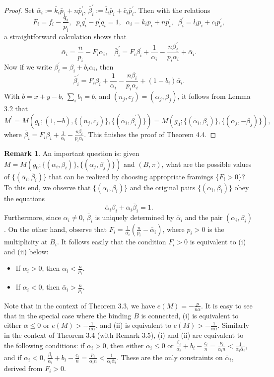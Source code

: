 \documentclass[11pt]{amsart}
\theoremstyle{plain}
\numberwithin{theorem}{section}
\theoremstyle{definition}
\newtheorem{remark}[theorem]{Remark}
\begin{document}
\begin{proof}
Set $\bar{\alpha}_i:=\bar{k}_i\bar{p}_i+n\bar{p}_i^\prime$, 
$\bar{\beta}_i^\prime:=\bar{l}_i\bar{p}_i+\bar{c}_i\bar{p}_i^\prime$. Then with the relations
$$
F_i=f_i-\frac{q_i}{p_i},\;\; p_iq_i^\prime-p_i^\prime q_i=1, \;\; \alpha_i=k_ip_i+np_i^\prime, \;\;\beta_i^\prime=l_ip_i+c_ip_i^\prime, 
$$
a straightforward calculation shows that
$$
\bar{\alpha}_i=\frac{n}{p_i}-F_i\alpha_i, \;\;\;
\bar{\beta}_i^\prime=F_i\beta_i^\prime+\frac{1}{\alpha_i}
-\frac{n\beta_i^\prime}{p_i\alpha_i}+\bar{\alpha}_i.
$$
Now if we write $\beta_i^\prime=\beta_i+b_i\alpha_i$, then
$$
\bar{\beta}_i^\prime=F_i\beta_i+\frac{1}{\alpha_i}
-\frac{n\beta_i}{p_i\alpha_i}+ (1-b_i)\bar{\alpha}_i.
$$
With $\bar{b}=x+y-b$, $\sum_ib_i=b$, and $(n_j,c_j)=(\alpha_j,\beta_j)$, it follows from Lemma 3.2 that
$$
M^\prime=M(g_0; (1,-\bar{b}), \{(n_j,\bar{c}_j)\}, \{(\bar{\alpha}_i,\bar{\beta}_i^\prime)\})=
M(g_0; \{(\bar{\alpha}_i,\bar{\beta}_i)\}, \{(\alpha_j,-\beta_j)\}),
$$
where $\bar{\beta}_i=F_i\beta_i+\frac{1}{\alpha_i}-\frac{n\beta_i}{p_i\alpha_i}$. This finishes the proof of Theorem 4.4.

\end{proof}

\begin{remark}
An important question is: given $M=M(g_0; \{(\alpha_i,\beta_i)\}, \{(\alpha_j,\beta_j)\})$ and $(B,\pi)$, what are the possible values of $\{(\bar{\alpha}_i,\bar{\beta}_i)\}$ that can be realized by choosing
appropriate framings $\{F_i>0\}$? To this end, we observe that $\{(\bar{\alpha}_i,\bar{\beta}_i)\}$ and
the original pairs $\{(\alpha_i,\beta_i)\}$ obey the equations
$$
\bar{\alpha}_i\beta_i+\alpha_i\bar{\beta}_i=1. 
$$
Furthermore, since $\alpha_i\neq 0$, $\bar{\beta}_i$ is uniquely determined by $\bar{\alpha}_i$ and the pair $(\alpha_i,\beta_i)$. On the other hand, observe that 
$F_i=\frac{1}{\alpha_i}(\frac{n}{p_i}-\bar{\alpha}_i)$, where $p_i>0$ is the multiplicity at $B_i$. It follows easily that the condition $F_i>0$ is
equivalent to (i) and (ii) below:
\begin{itemize}
\item [{(i)}] If $\alpha_i>0$, then $\bar{\alpha}_i<\frac{n}{p_i}$.
\item [{(ii)}] If $\alpha_i<0$, then $\bar{\alpha}_i>\frac{n}{p_i}$. 
\end{itemize}

Note that in the context of Theorem 3.3, we have $e(M)=-\frac{p}{n\alpha}$. It is easy to see that
in the special case where the binding $B$ is connected,  
(i) is equivalent to either $\bar{\alpha}\leq 0$ or $e(M)>-\frac{1}{\alpha\bar{\alpha}}$, and (ii) is
equivalent to $e(M)>-\frac{1}{\alpha\bar{\alpha}}$. Similarly in the context of Theorem 3.4 
(with Remark 3.5), (i) and (ii) 
are equivalent to the following conditions: if $\alpha_i>0$, then either $\bar{\alpha}_i\leq 0$ or 
$\frac{\beta_i}{\alpha_i}+b_i-\frac{c_i}{n}=\frac{p_i}{\alpha_i n}<\frac{1}{\alpha_i\bar{\alpha}_i}$, and if $\alpha_i<0$,
$\frac{\beta_i}{\alpha_i}+b_i-\frac{c_i}{n}=\frac{p_i}{\alpha_i n}<\frac{1}{\alpha_i\bar{\alpha}_i}$. 
These are the only constraints on $\bar{\alpha}_i$, derived from $F_i>0$. 
\end{remark}
\end{document}
